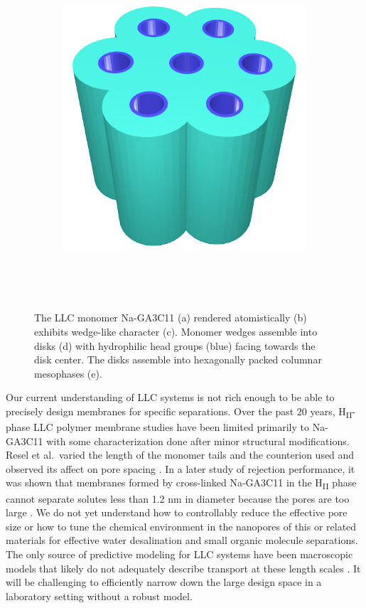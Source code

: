 \documentclass{article}
\begin{document}
\begin{figure}
\begin{subfigure}{0.4\linewidth}
		\caption{}~\label{fig:wedge_layer}
	\end{subfigure}
	\begin{subfigure}{0.4\linewidth}
		\centering
		\includegraphics[width=\textwidth]{hexagonal_packing.png}
		\caption{}~\label{fig:hex_packing_simple}
	\end{subfigure}
	\caption{The LLC monomer Na-GA3C11 (a) rendered atomistically (b)
	exhibits wedge-like character (c). Monomer wedges assemble into disks (d) with
	hydrophilic head groups (blue) facing towards the disk center. The disks
	assemble into hexagonally packed columnar mesophases (e).}~\label{fig:assembly}
  \end{figure}

  Our current understanding of LLC systems is not rich enough to be able to
  precisely design membranes for specific separations. Over the past 20 years,
  H\textsubscript{II}-phase LLC polymer membrane studies have been limited
  primarily to Na-GA3C11 with some characterization done after minor structural
  modifications. Resel et al.~varied the length of the monomer tails and the
  counterion used and observed its affect on pore spacing
  \cite{resel_structural_2000}. In a later study of rejection performance, it
  was shown that membranes formed by cross-linked Na-GA3C11 in the
  H\textsubscript{II} phase cannot separate solutes less than 1.2 nm in
  diameter because the pores are too large \cite{zhou_supported_2005}. We do not
  yet understand how to controllably reduce the effective pore size or how to
  tune the chemical environment in the nanopores of this or related materials for
  effective water desalination and small organic molecule separations. The only
  source of predictive modeling for LLC systems have been macroscopic models that
  likely do not adequately describe transport at these length scales
  \cite{hatakeyama_water_2011}. It will be challenging to efficiently narrow down
  the large design space in a laboratory setting without a robust model.
\end{document}
